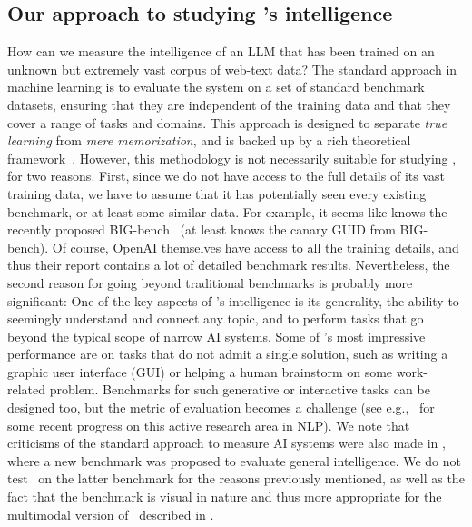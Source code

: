     \subsection{Our approach to studying \DV's intelligence}
    How can we measure the intelligence of an LLM that has been trained on an unknown but extremely vast corpus of web-text data? The standard approach in machine learning is to evaluate the system on a set of standard benchmark datasets, ensuring that they are independent of the training data and that they cover a range of tasks and domains. This approach is designed to separate {\em true learning} from {\em mere memorization}, and is backed up by a rich theoretical framework~\cite{shalev2014understanding, mohri2018foundations}. However, this methodology is not necessarily suitable for studying {\DV}, for two reasons. First, since we do not have access to the full details of its vast training data, we have to assume that it has potentially seen every existing benchmark, or at least some similar data. For example, it seems like {\DV} knows the recently proposed BIG-bench~\cite{srivastava2022beyond} (at least {\DV} knows the canary GUID from BIG-bench). Of course, OpenAI themselves have access to all the training details, and thus their report \cite{gpt4} contains a lot of detailed benchmark results. Nevertheless, the second reason for going beyond traditional benchmarks is probably more significant:
    One of the key aspects of \DV's intelligence is its generality, the ability to seemingly understand and connect any topic, and to perform tasks that go beyond the typical scope of narrow AI systems. Some of \DV's most impressive performance are on tasks that do not admit a single solution, such as writing a graphic user interface (GUI) or helping a human brainstorm on some work-related problem. Benchmarks for such generative or interactive tasks can be designed too, but the metric of evaluation becomes a challenge (see e.g.,~\cite{NEURIPS2021_260c2432} for some recent progress on this active research area in NLP). We note that criticisms of the standard approach to measure AI systems were also made in \cite{chollet2019measure}, where a new benchmark was proposed to evaluate general intelligence. We do not test \DV\ on the latter benchmark for the reasons previously mentioned, as well as the fact that the benchmark is visual in nature and thus more appropriate for the multimodal version of \DV\ described in \cite{gpt4}.
    \newline
    
